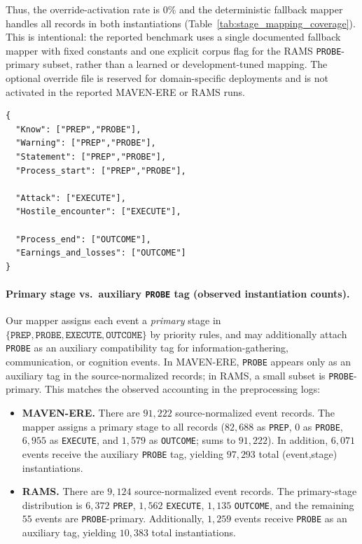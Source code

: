 \documentclass{article}
\begin{document}
Thus, the override-activation rate is $0\%$ and the deterministic fallback mapper handles all records in both instantiations (Table~\ref{tab:stage_mapping_coverage}).
This is intentional: the reported benchmark uses a single documented fallback mapper with fixed constants and one explicit corpus flag for the RAMS \texttt{PROBE}-primary subset, rather than a learned or development-tuned mapping.
The optional override file is reserved for domain-specific deployments and is not activated in the reported MAVEN-ERE or RAMS runs.

\begin{lstlisting}[caption={Optional stage override mapping file format (illustrative JSON; not activated in the reported runs).},label={lst:stage_mapping_json_ex}]
{
  "Know": ["PREP","PROBE"],
  "Warning": ["PREP","PROBE"],
  "Statement": ["PREP","PROBE"],
  "Process_start": ["PREP","PROBE"],

  "Attack": ["EXECUTE"],
  "Hostile_encounter": ["EXECUTE"],

  "Process_end": ["OUTCOME"],
  "Earnings_and_losses": ["OUTCOME"]
}
\end{lstlisting}

\paragraph{Primary stage vs.\ auxiliary \texttt{PROBE} tag (observed instantiation counts).}
Our mapper assigns each event a \emph{primary} stage in
$\{\texttt{PREP},\texttt{PROBE},\texttt{EXECUTE},\texttt{OUTCOME}\}$ by priority rules, and may additionally attach \texttt{PROBE} as an auxiliary compatibility tag for information-gathering, communication, or cognition events.
In MAVEN-ERE, \texttt{PROBE} appears only as an auxiliary tag in the source-normalized records; in RAMS, a small subset is \texttt{PROBE}-primary.
This matches the observed accounting in the preprocessing logs:

\begin{itemize}
    \item \textbf{MAVEN-ERE.} There are $91{,}222$ source-normalized event records. The mapper assigns a primary stage to all records
    ($82{,}688$ as \texttt{PREP}, $0$ as \texttt{PROBE}, $6{,}955$ as \texttt{EXECUTE}, and $1{,}579$ as \texttt{OUTCOME}; sums to $91{,}222$).
    In addition, $6{,}071$ events receive the auxiliary \texttt{PROBE} tag, yielding $97{,}293$ total (event,stage) instantiations.
    \item \textbf{RAMS.} There are $9{,}124$ source-normalized event records. The primary-stage distribution is
    $6{,}372$ \texttt{PREP}, $1{,}562$ \texttt{EXECUTE}, $1{,}135$ \texttt{OUTCOME}, and the remaining $55$ events are \texttt{PROBE}-primary.
    Additionally, $1{,}259$ events receive \texttt{PROBE} as an auxiliary tag, yielding $10{,}383$ total instantiations.
\end{itemize}
\end{document}
